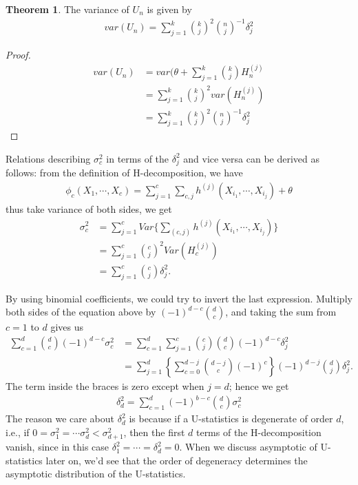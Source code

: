 \documentclass{article}
\theoremstyle{definition}
\newtheorem{theorem}{Theorem}
\numberwithin{Def}{section}
\begin{document}
    
    \begin{theorem}
    The variance of $U_n$ is given by 
    \begin{align}
        var(U_n) = \sum_{j=1}^k {k \choose j}^2 {n \choose j}^{-1}\delta_j^2
    \end{align}
    \end{theorem}
    \begin{proof}
    \begin{align*}
        var(U_n) &= var(\theta + \sum_{j=1}^k {k \choose j}H_n^{(j)} \\
        &= \sum_{j=1}^k {k \choose j}^2var(H_n^{(j)})\\
        &= \sum_{j=1}^k {k \choose j}^2 {n \choose j}^{-1}\delta_j^2
    \end{align*}
    \end{proof}

    Relations describing $\sigma_{c}^2$ in terms of the $\delta_j^2 $ and vice versa can be derived as follows: from the definition of H-decomposition, we have 
    \begin{align*}
        \phi_c (X_1, \cdots, X_c) = \sum_{j = 1}^c \sum_{c,j} h^{(j)} (X_{i_{1}}, \cdots , X_{i_j}) + \theta
    \end{align*}
    thus take variance of both sides, we get 
    \begin{align*}
        \sigma_{c}^2 &= \sum_{j = 1}^c Var\{ \sum_{(c, j)} h^{(j)} (X_{i_{1}}, \cdots , X_{i_j})\} \\
        &= \sum_{j = 1}^c {c \choose j}^2 Var( H_c^{(j)}) \\ 
        &= \sum_{j = 1}^c {c \choose j} \delta_j^2.
    \end{align*}
    
    By using binomial coefficients, we could try to invert the last expression. Multiply both sides of the equation above by  $(-1)^{d-c} {d \choose c}$, and taking the sum from $c = 1$ to $d$ gives us
    \begin{align*}
        \sum_{c=1}^d {d \choose c} (-1)^{d-c} \sigma_{c}^2 &= \sum_{c=1}^d  
       \sum_{j = 1}^c {c \choose j}  {d \choose c} (-1)^{d-c} \delta_j^2 \\
       &= \sum_{j=1}^d \left\{ \sum_{c = 0}^{d - j} {d - j \choose c} (-1)^c \right\} (-1)^{d -j} {d \choose j} \delta_j^2.
    \end{align*}
    The term inside the braces is zero except when $j = d$; hence we get 
    \begin{align*}
        \delta_d^2 = \sum_{c = 1}^d (-1)^{b-c} {d \choose c} \sigma_{c}^2
    \end{align*}
    The reason we care about $\delta_d^2$ is because if a U-statistics is degenerate of order $d$, i.e., if $0 = \sigma_1^2 = \cdots \sigma_d^2 < \sigma_{d+1}^2$, then the first $d$ terms of the H-decomposition vanish, since in this case $\delta_1^2 = \cdots = \delta_d^2 = 0.$ When we discuss asymptotic of U-statistics later on, we'd see that the order of degeneracy determines the asymptotic distribution of the U-statistics.  
    
\end{document}

